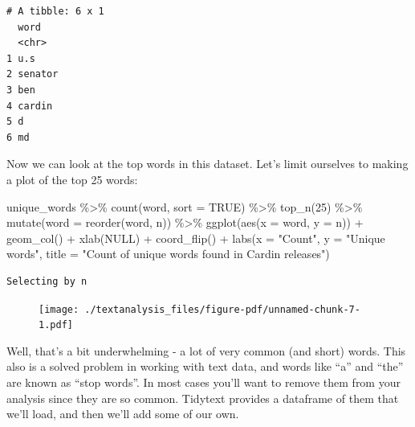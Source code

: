 \documentclass[
  letterpaper,
  DIV=11,
  numbers=noendperiod]{scrreprt}
\newenvironment{Shaded}{\begin{snugshade}}{\end{snugshade}}
\newcommand{\AttributeTok}[1]{\textcolor[rgb]{0.40,0.45,0.13}{#1}}
\newcommand{\ConstantTok}[1]{\textcolor[rgb]{0.56,0.35,0.01}{#1}}
\newcommand{\DecValTok}[1]{\textcolor[rgb]{0.68,0.00,0.00}{#1}}
\newcommand{\FunctionTok}[1]{\textcolor[rgb]{0.28,0.35,0.67}{#1}}
\newcommand{\NormalTok}[1]{\textcolor[rgb]{0.00,0.23,0.31}{#1}}
\newcommand{\SpecialCharTok}[1]{\textcolor[rgb]{0.37,0.37,0.37}{#1}}
\newcommand{\StringTok}[1]{\textcolor[rgb]{0.13,0.47,0.30}{#1}}
\begin{document}
\begin{verbatim}
# A tibble: 6 x 1
  word   
  <chr>  
1 u.s    
2 senator
3 ben    
4 cardin 
5 d      
6 md     
\end{verbatim}

Now we can look at the top words in this dataset. Let's limit ourselves
to making a plot of the top 25 words:

\begin{Shaded}
\begin{Highlighting}[]
\NormalTok{unique\_words }\SpecialCharTok{\%\textgreater{}\%}
  \FunctionTok{count}\NormalTok{(word, }\AttributeTok{sort =} \ConstantTok{TRUE}\NormalTok{) }\SpecialCharTok{\%\textgreater{}\%}
  \FunctionTok{top\_n}\NormalTok{(}\DecValTok{25}\NormalTok{) }\SpecialCharTok{\%\textgreater{}\%}
  \FunctionTok{mutate}\NormalTok{(}\AttributeTok{word =} \FunctionTok{reorder}\NormalTok{(word, n)) }\SpecialCharTok{\%\textgreater{}\%}
  \FunctionTok{ggplot}\NormalTok{(}\FunctionTok{aes}\NormalTok{(}\AttributeTok{x =}\NormalTok{ word, }\AttributeTok{y =}\NormalTok{ n)) }\SpecialCharTok{+}
  \FunctionTok{geom\_col}\NormalTok{() }\SpecialCharTok{+}
  \FunctionTok{xlab}\NormalTok{(}\ConstantTok{NULL}\NormalTok{) }\SpecialCharTok{+}
  \FunctionTok{coord\_flip}\NormalTok{() }\SpecialCharTok{+}
      \FunctionTok{labs}\NormalTok{(}\AttributeTok{x =} \StringTok{"Count"}\NormalTok{,}
      \AttributeTok{y =} \StringTok{"Unique words"}\NormalTok{,}
      \AttributeTok{title =} \StringTok{"Count of unique words found in Cardin releases"}\NormalTok{)}
\end{Highlighting}
\end{Shaded}

\begin{verbatim}
Selecting by n
\end{verbatim}

\begin{figure}[H]

{\centering \texttt{[image: ./textanalysis\_files/figure-pdf/unnamed-chunk-7-1.pdf]}

}

\end{figure}

Well, that's a bit underwhelming - a lot of very common (and short)
words. This also is a solved problem in working with text data, and
words like ``a'' and ``the'' are known as ``stop words''. In most cases
you'll want to remove them from your analysis since they are so common.
Tidytext provides a dataframe of them that we'll load, and then we'll
add some of our own.
\end{document}
